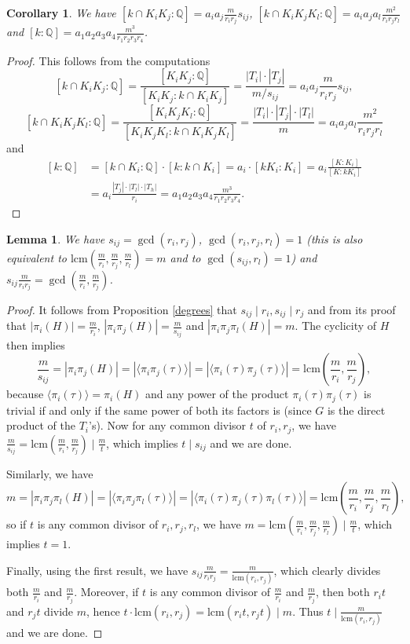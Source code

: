 \documentclass[12pt,a4paper]{article}
\newtheorem{lemma}[theorem]{Lemma}
\newtheorem{cor}[theorem]{Corollary}
\newcommand{\Q}{\mathbb{Q}}
\newcommand{\lcm}{\mathrm{lcm}}
\begin{document}
\begin{cor}\label{compcap}
We have $[k\cap K_iK_j:\Q]=a_ia_j\frac{m}{r_ir_j}s_{ij}$, $[k\cap K_iK_jK_l:\Q]=a_ia_ja_l\frac{m^2}{r_ir_jr_l}$ and $[k:\Q]=a_1a_2a_3a_4\frac{m^3}{r_1r_2r_3r_4}$.
\end{cor}
\begin{proof}
This follows from the computations
$$[k\cap K_iK_j:\Q]=\frac{[K_iK_j:\Q]}{[K_iK_j:k\cap K_iK_j]}=\frac{|T_i|\cdot|T_j|}{m/s_{ij}}=a_ia_j\frac{m}{r_ir_j}s_{ij},$$
$$[k\cap K_iK_jK_l:\Q]=\frac{[K_iK_jK_l:\Q]}{[K_iK_jK_l:k\cap K_iK_jK_l]}=\frac{|T_i|\cdot|T_j|\cdot|T_l|}{m}=a_ia_ja_l\frac{m^2}{r_ir_jr_l}$$
and
\begin{equation*}
\begin{split}
[k:\Q]&=[k\cap K_i:\Q]\cdot [k:k\cap K_i]=a_i\cdot [kK_i:K_i]=a_i\frac{[K:K_i]}{[K:kK_i]}\\
&=a_i\frac{|T_j|\cdot|T_l|\cdot|T_h|}{r_i}=
a_1a_2a_3a_4\frac{m^3}{r_1r_2r_3r_4}.
\end{split}
\end{equation*}

\end{proof}
\begin{lemma}\label{coprime}
We have $s_{ij}=\gcd(r_i,r_j)$, $\gcd(r_i,r_j,r_l)=1$ (this is also equivalent to $\lcm\left(\frac{m}{r_i},\frac{m}{r_j},\frac{m}{r_l}\right)=m$ and to $\gcd(s_{ij},r_l)=1$) and $s_{ij}\frac{m}{r_ir_j}=\gcd(\frac{m}{r_i},\frac{m}{r_j})$.
\end{lemma}
\begin{proof}
It follows from Proposition \ref{degrees} that $s_{ij}\mid r_i, s_{ij}\mid r_j$ and from its proof that $|\pi_i(H)|=\frac{m}{r_i}$, $|\pi_i\pi_j(H)|=\frac{m}{s_{ij}}$ and $|\pi_i\pi_j\pi_l(H)|=m$. The cyclicity of $H$ then implies
$$\frac{m}{s_{ij}}=|\pi_i\pi_j(H)|=|\langle\pi_i\pi_j(\tau)\rangle|=|\langle\pi_i(\tau)\pi_j(\tau)\rangle|=\lcm\left(\frac{m}{r_i},\frac{m}{r_j}\right),$$
because $\langle\pi_i(\tau)\rangle=\pi_i(H)$ and any power of the product $\pi_i(\tau)\pi_j(\tau)$ is trivial if and only if the same power of both its factors is (since $G$ is the direct product of the $T_i$'s). 
Now for any common divisor $t$ of $r_i,r_j$, we have $\frac{m}{s_{ij}}= \lcm\left(\frac{m}{r_i},\frac{m}{r_j}\right) \mid \frac{m}{t}$, which implies $t\mid s_{ij}$ and we are done.

Similarly, we have
$$m=|\pi_i\pi_j\pi_l(H)|=|\langle\pi_i\pi_j\pi_l(\tau)\rangle|=|\langle\pi_i(\tau)\pi_j(\tau)\pi_l(\tau)\rangle|=\lcm\left(\frac{m}{r_i},\frac{m}{r_j},\frac{m}{r_l}\right),$$
so if $t$ is any common divisor of $r_i,r_j,r_l$, we have $m=\lcm\left(\frac{m}{r_i},\frac{m}{r_j},\frac{m}{r_l}\right)\mid \frac{m}{t}$, which implies $t=1$.

Finally, using the first result, we have $s_{ij}\frac{m}{r_ir_j}=\frac{m}{\lcm(r_i,r_j)}$, which clearly divides both $\frac{m}{r_i}$ and $\frac{m}{r_j}$. Moreover, if $t$ is any common divisor of $\frac{m}{r_i}$ and $\frac{m}{r_j}$, then both $r_it$ and $r_jt$ divide $m$, hence $t\cdot\lcm(r_i,r_j)=\lcm(r_it,r_jt)\mid m$. Thus $t\mid \frac{m}{\lcm(r_i,r_j)}$ and we are done.
\end{proof}
\end{document}
